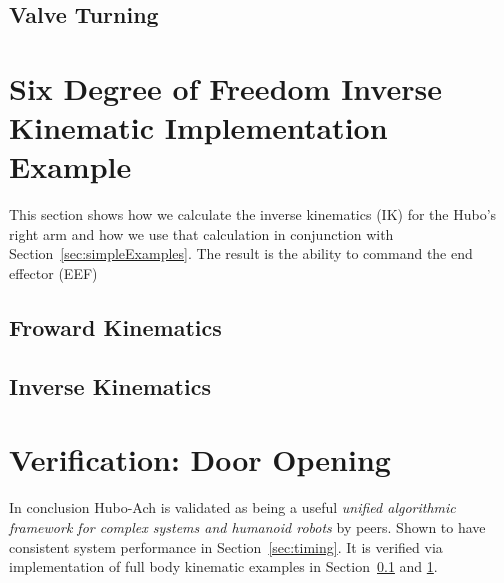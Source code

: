 \subsection{Valve Turning}\label{sec:valve}
	



\section{Six Degree of Freedom Inverse Kinematic Implementation Example}\label{sec:6dofik}
This section shows how we calculate the inverse kinematics (IK) for the Hubo's right arm and how we use that calculation in conjunction with Section~\ref{sec:simpleExamples}.  The result is the ability to command the end effector (EEF)


	\subsection{Froward Kinematics} 
		
	\subsection{Inverse Kinematics}\label{sec:ik}
			

\section{Verification: Door Opening}\label{sec:hubo-achVerification}
	



In conclusion Hubo-Ach is validated as being a useful \textit{unified algorithmic framework for complex systems and humanoid robots} by peers.
Shown to have consistent system performance in Section~\ref{sec:timing}.
It is verified via implementation of full body kinematic examples in Section~\ref{sec:valve} and \ref{sec:6dofik}.









